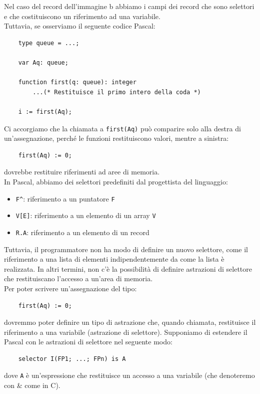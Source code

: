 \documentclass{article}
\begin{document}
	Nel caso del record dell'immagine b abbiamo i campi dei record che sono selettori e che costituiscono un riferimento ad una variabile.
	\vspace{\baselineskip} \\
	Tuttavia, se osserviamo il seguente codice Pascal:
	\begin{verbatim}
	type queue = ...;
	
	var Aq: queue;
	
	function first(q: queue): integer
		...(* Restituisce il primo intero della coda *)
	
	i := first(Aq);
	\end{verbatim}
	Ci accorgiamo che la chiamata a \texttt{first(Aq)} può comparire solo alla destra di un'assegnazione, perché le funzioni restituiscono valori, mentre a sinistra:
	\begin{verbatim}
	first(Aq) := 0;
	\end{verbatim}
	dovrebbe restituire riferimenti ad aree di memoria.
	\vspace{\baselineskip} \\
	In Pascal, abbiamo dei selettori predefiniti dal progettista del linguaggio:
	\begin{itemize}
		\item \texttt{F\^}: riferimento a un puntatore \texttt{F}
		\item \texttt{V[E]}: riferimento a un elemento di un array \texttt{V}
		\item \texttt{R.A}: riferimento a un elemento di un record
	\end{itemize}
	Tuttavia, il programmatore non ha modo di definire un nuovo selettore, come il riferimento a una lista di elementi indipendentemente da come la lista è realizzata. In altri termini, non c'è la possibilità di definire astrazioni di selettore che restituiscano l'accesso a un'area di memoria.
	\vspace{\baselineskip} \\
	Per poter scrivere un'assegnazione del tipo:
	\begin{verbatim}
	first(Aq) := 0;
	\end{verbatim}
	dovremmo poter definire un tipo di astrazione che, quando chiamata, restituisce il riferimento a una variabile (astrazione di selettore). Supponiamo di estendere il Pascal con le astrazioni di selettore nel seguente modo:
	\begin{verbatim}
	selector I(FP1; ...; FPn) is A
	\end{verbatim}
	dove \texttt{A} è un'espressione che restituisce un accesso a una variabile (che denoteremo con \& come in C).
\end{document}
